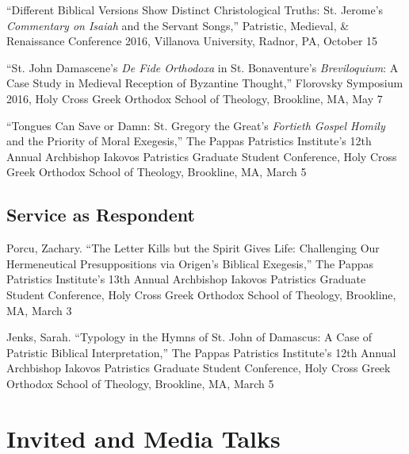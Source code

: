 \documentclass[letterpaper,12pt]{article}
\newcommand{\years}[1]{%
  {\reversemarginpar\strut\marginnote{{\small#1}}}%
}
\begin{document}
{{{{{{{{%
\years{2016}%
%
``Different Biblical Versions Show Distinct Christological Truths: St. Jerome's \emph{Commentary on Isaiah} and the Servant Songs,'' Patristic, Medieval, \& Renaissance Conference 2016, Villanova University, Radnor, PA, October 15 \\ [.3cm]
%
\years{2016}%
%
``St. John Damascene's \emph{De Fide Orthodoxa} in St. Bonaventure's \emph{Breviloquium}: A Case Study in Medieval Reception of Byzantine Thought,'' Florovsky Symposium 2016, Holy Cross Greek Orthodox School of Theology, Brookline, MA, May 7 \\ [.3cm]
%
\years{2016}%
%
``Tongues Can Save or Damn: St. Gregory the Great's \emph{Fortieth Gospel Homily} and the Priority of Moral Exegesis,'' The Pappas Patristics Institute's 12th Annual Archbishop Iakovos Patristics Graduate Student Conference, Holy Cross Greek Orthodox School of Theology, Brookline, MA, March 5

\subsection*{Service as Respondent}

\years{2017}%
%
Porcu, Zachary. ``The Letter Kills but the Spirit Gives Life: Challenging Our Hermeneutical Presuppositions via Origen's Biblical Exegesis,'' The Pappas Patristics Institute's 13th Annual Archbishop Iakovos Patristics Graduate Student Conference, Holy Cross Greek Orthodox School of Theology, Brookline, MA, March 3 \\ [.3cm]
%
\years{2016}%
%
Jenks, Sarah. ``Typology in the Hymns of St. John of Damascus: A Case of Patristic Biblical Interpretation,'' The Pappas Patristics Institute's 12th Annual Archbishop Iakovos Patristics Graduate Student Conference, Holy Cross Greek Orthodox School of Theology, Brookline, MA, March 5

\section*{Invited and Media Talks}

}}}}}}}}
\end{document}
